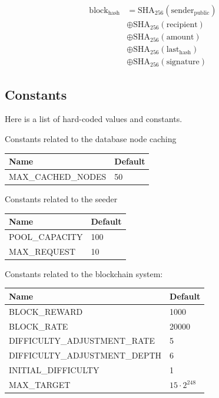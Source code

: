 \documentclass[../documentation.tex]{subfiles}
\begin{document}
\begin{align*}
    \text{block}_\text{hash} &=
    \text{SHA}_{256}(\text{sender}_\text{public}) \\
    &\oplus \text{SHA}_{256}(\text{recipient}) \\
    &\oplus \text{SHA}_{256}(\text{amount}) \\
    &\oplus \text{SHA}_{256}(\text{last}_\text{hash}) \\
    &\oplus \text{SHA}_{256}(\text{signature})
\end{align*}

\pagebreak

\hypertarget{constants}{}
\subsection{Constants}

Here is a list of hard-coded values and constants.

Constants related to the database node caching

\bgroup{}
\def\arraystretch{1.25}
\begin{tabular}{|l|l|}
    \hline
    \textbf{Name} & \textbf{Default}
    \\ \hline
    MAX\_CACHED\_NODES & 50
    \\ \hline
\end{tabular}
\egroup{}

Constants related to the seeder

\bgroup{}
\def\arraystretch{1.25}
\begin{tabular}{|l|l|}
    \hline
    \textbf{Name} & \textbf{Default}
    \\ \hline
    POOL\_CAPACITY & 100
    \\ \hline
    MAX\_REQUEST & 10
    \\ \hline
\end{tabular}
\egroup{}

Constants related to the blockchain system:

\bgroup{}
\def\arraystretch{1.25}
\begin{tabular}{|l|l|}
    \hline
    \textbf{Name} & \textbf{Default}
    \\ \hline
    BLOCK\_REWARD & 1000
    \\ \hline
    BLOCK\_RATE & 20000
    \\ \hline
    DIFFICULTY\_ADJUSTMENT\_RATE & 5
    \\ \hline
    DIFFICULTY\_ADJUSTMENT\_DEPTH & 6
    \\ \hline
    INITIAL\_DIFFICULTY & 1
    \\ \hline
    MAX\_TARGET & \(15 \cdot 2^{248}\)
    \\ \hline
\end{tabular}
\egroup{}
\end{document}
